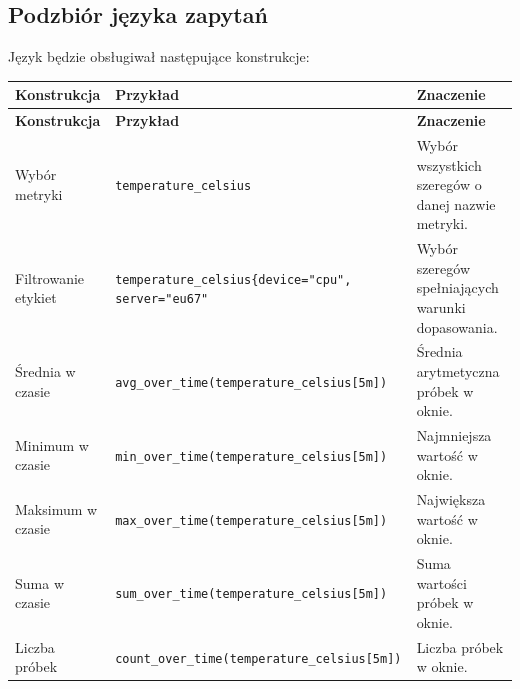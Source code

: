 \documentclass[12pt,a4paper]{article}
\begin{document}
\subsection{Podzbiór języka zapytań}

Język będzie obsługiwał następujące konstrukcje:

\begingroup
\small
\begin{longtable}{>{\raggedright\arraybackslash}p{}>{\raggedright\arraybackslash}p{}>{\raggedright\arraybackslash}p{}}
    \hline
    \textbf{Konstrukcja} & \textbf{Przykład}                                                                                        & \textbf{Znaczenie}                                \\
    \hline
    \endfirsthead
    \textbf{Konstrukcja} & \textbf{Przykład}                                                                                        & \textbf{Znaczenie}                                \\
    \hline
    \endhead
    Wybór metryki        & \texttt{temperature\_\allowbreak{}celsius}                                                               & Wybór wszystkich szeregów o danej nazwie metryki. \\
    \hline
    Filtrowanie etykiet  & \texttt{temperature\_\allowbreak{}celsius\{\allowbreak{}device="cpu",\allowbreak{} server="eu67"}        & Wybór szeregów spełniających warunki dopasowania. \\
    \hline
    Średnia w czasie     & \texttt{avg\_\allowbreak{}over\_\allowbreak{}time(\allowbreak{}temperature\_\allowbreak{}celsius[5m])}   & Średnia arytmetyczna próbek w oknie.              \\
    \hline
    Minimum w czasie     & \texttt{min\_\allowbreak{}over\_\allowbreak{}time(\allowbreak{}temperature\_\allowbreak{}celsius[5m])}   & Najmniejsza wartość w oknie.                      \\
    \hline
    Maksimum w czasie    & \texttt{max\_\allowbreak{}over\_\allowbreak{}time(\allowbreak{}temperature\_\allowbreak{}celsius[5m])}   & Największa wartość w oknie.                       \\
    \hline
    Suma w czasie        & \texttt{sum\_\allowbreak{}over\_\allowbreak{}time(\allowbreak{}temperature\_\allowbreak{}celsius[5m])}   & Suma wartości próbek w oknie.                     \\
    \hline
    Liczba próbek        & \texttt{count\_\allowbreak{}over\_\allowbreak{}time(\allowbreak{}temperature\_\allowbreak{}celsius[5m])} & Liczba próbek w oknie.                            \\
    \hline
\end{longtable}
\endgroup
\end{document}
